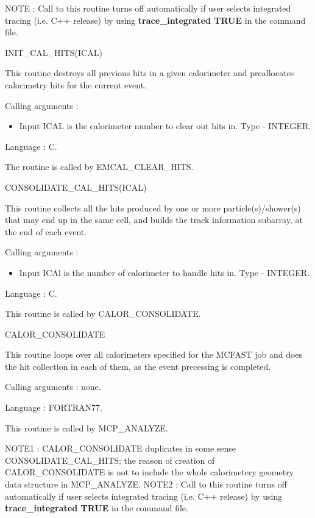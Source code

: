 NOTE : Call to this routine turns off automatically if user selects integrated tracing 
(i.e. C++ release) by using {\bf trace\_integrated TRUE} in the command file. 

\newpage
\begin{center}
{INIT\_CAL\_HITS(ICAL)}
\end{center}

This routine destroys all previous hits in a given calorimeter and preallocates 
calorimetry hits for the current event.

Calling arguments :
\begin{itemize}
\item{Input ICAL is the calorimeter number to clear out hits in.
Type - INTEGER.}
\end{itemize}

Language : C.

The routine is called by EMCAL\_CLEAR\_HITS.

\bigskip

\begin{center}
CONSOLIDATE\_CAL\_HITS(ICAL)
\end{center}

This routine collects all the hits produced by one or more particle(s)/shower(s)
that may end up in the same cell, and builds the track information subarray,
at the end of each event.

Calling arguments :
\begin{itemize}
\item {Input ICAl is the number of calorimeter to handle hits in. Type - INTEGER.}
\end{itemize}

Language : C.

This routine is called by CALOR\_CONSOLIDATE.

\begin{center}
CALOR\_CONSOLIDATE
\end{center}

This routine loops over all calorimeters specified for the MCFAST job and
does the hit collection in each of them, as the event precessing is completed.

Calling arguments : none.

Language : FORTRAN77.

This routine is called by MCP\_ANALYZE.

NOTE1 : CALOR\_CONSOLIDATE duplicates in some sense CONSOLIDATE\_CAL\_HITS;
the reason of creation of CALOR\_CONSOLIDATE is not to include the whole
calorimetery geometry data structure in MCP\_ANALYZE.
NOTE2 : Call to this routine turns off automatically if user selects integrated tracing 
(i.e. C++ release) by using {\bf trace\_integrated TRUE} in the command file. 


